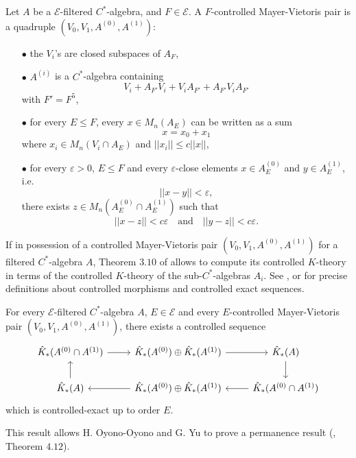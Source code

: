 \begin{definition}
Let $A$ be a $\mathcal E$-filtered $C^*$-algebra, and $F\in \mathcal E$. A $F$-controlled Mayer-Vietoris pair is a quadruple $(V_0, V_1, A^{(0)}, A^{(1)})$:
\begin{itemize}
\item[$\bullet$] the $V_i$'s are closed subspaces of $A_F$,
\item[$\bullet$] $A^{(i)}$ is a $C^*$-algebra containing \[ V_i + A_{F'} V_i + V_i A_{F'}  + A_{F'} V_i A_{F'}\]
with $F' = F^5$,
\item[$\bullet$] for every $E\leq F$, every $x\in M_n(A_E)$ can be written as a sum \[x=x_0+x_1\] where $x_i\in M_n(V_i \cap A_E)$ and $|| x_i|| \leq c||x||$,
\item[$\bullet$] for every $\varepsilon>0$, $E\leq F$ and every $\varepsilon$-close elements $x\in A_E^{(0)}$ and $y\in A_E^{(1)}$, i.e.
\[|| x-y || < \varepsilon,\]
there exists $z\in M_n( A_E^{(0)}\cap A_E^{(1)})$ such that \[ ||x-z|| < c\varepsilon \quad \text{and} \quad ||y-z|| < c\varepsilon .\]
\end{itemize}
\end{definition} 

If in possession of a controlled Mayer-Vietoris pair $(V_0, V_1, A^{(0)}, A^{(1)})$ for a filtered $C^*$-algebra $A$, Theorem $3.10$ of \cite{OY4} allows to compute its controlled $K$-theory in terms of the controlled $K$-theory of the sub-$C^*$-algebras $A_i$. See \cite{OY4},\cite{DellAieraThesis} or \cite{dell2017controlled} for precise definitions about controlled morphisms and controlled exact sequences. 

\begin{thm}
For every $\mathcal E$-filtered $C^*$-algebra $A$, $E\in \mathcal E$ and every $E$-controlled Mayer-Vietoris pair $(V_0, V_1, A^{(0)}, A^{(1)})$, there exists a controlled sequence
\[\begin{tikzcd}
 \hat K_*( A^{(0)}\cap A^{(1)} ) \arrow{r} & \hat K_*(A^{(0)}) \oplus \hat K_*(A^{(1)}) \arrow{r} & \hat K_*(A) \arrow{d} \\ 
 \hat K_*(A) \arrow{u} & \hat K_*(A^{(0)}) \oplus \hat K_*(A^{(1)}) \arrow{l} & \hat K_*( A^{(0)}\cap A^{(1)} ) \arrow{l}
\end{tikzcd}\]
which is controlled-exact up to order $E$.  
\end{thm}  

This result allows H. Oyono-Oyono and G. Yu to prove a permanence result (\cite{OY4}, Theorem $4.12$).

